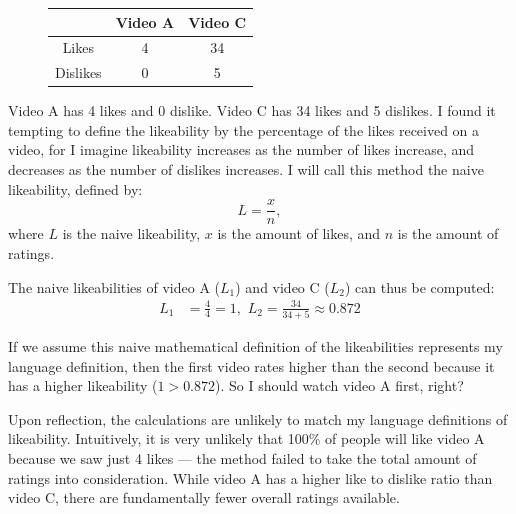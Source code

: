 \documentclass[a4paper,11pt]{article}
\begin{document}
\begin{figure}[H]
    \centering
    \begin{tabular}{c|c|c}
        & Video A & Video C \\
        \hline
        \hline
        Likes & 4 & 34\\
        \hline
        Dislikes & 0 & 5
    \end{tabular}
    \label{tbl:ex}
\end{figure}



Video A has 4 likes and 0 dislike. Video C has 34 likes and 5 dislikes. I found it tempting to define the likeability by the percentage of the likes received on a video, for I imagine likeability increases as the number of likes increase, and decreases as the number of dislikes increases. I will call this method the naive likeability, defined by:
\[
    L = \frac{x}{n},
\]
where $L$ is the naive likeability, $x$ is the amount of likes, and $n$ is the amount of ratings.

The naive likeabilities of video A ($L_1$) and video C ($L_2$) can thus be computed:
\begin{align*}
    L_{1} &= \frac{4}{4} = 1, \,\, L_{2} = \frac{34}{34 + 5} \approx 0.872
\end{align*}

If we assume this naive mathematical definition of the likeabilities represents my language definition, then the first video rates higher than the second because it has a higher likeability ($1 > 0.872$). So I should watch video A first, right?

Upon reflection, the calculations are unlikely to match my language definitions of likeability. Intuitively, it is very unlikely that 100\% of people will like video A because we saw just 4 likes --- the method failed to take the total amount of ratings into consideration. While video A has a higher like to dislike ratio than video C, there are fundamentally fewer overall ratings available.
\end{document}
